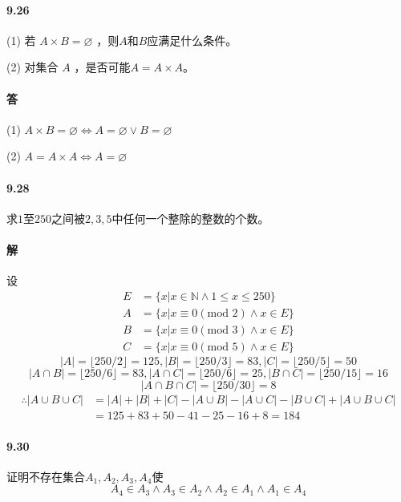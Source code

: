 \documentclass[UTF8]{ctexart}
\newcommand{\snatural}{\mathbb{N}}
\newcommand{\modt}{\text{mod }}
\begin{document}
\paragraph{9.26} \label{9.26}
(1) 若 $A \times B = \varnothing$ ，则$A$和$B$应满足什么条件。

(2) 对集合 $A$ ，是否可能$A = A \times A$。

\paragraph{答}
(1) $A \times B = \varnothing \Longleftrightarrow A=\varnothing \lor B = \varnothing$

(2) $A = A \times A \Longleftrightarrow A = \varnothing$

\paragraph{9.28} \label{9.28}
求$1$至$250$之间被$2,3,5$中任何一个整除的整数的个数。

\paragraph{解}
设
\begin{align*}
    E & = \{x|x \in \snatural \land 1\le x \le 250\} \\
    A & = \{x|x \equiv 0 (\modt 2) \land x \in E\} \\
    B & = \{x|x \equiv 0 (\modt 3) \land x \in E\} \\
    C & = \{x|x \equiv 0 (\modt 5) \land x \in E\} 
\end{align*}
$$|A|=\lfloor 250/2 \rfloor = 125, |B|=\lfloor 250/3 \rfloor = 83, |C|=\lfloor 250/5 \rfloor = 50 $$
$$|A \cap B|=\lfloor 250/6 \rfloor = 83, |A\cap C|=\lfloor 250/6 \rfloor = 25, |B\cap C|=\lfloor 250/15 \rfloor = 16 $$
$$|A \cap B \cap C|=\lfloor 250/30 \rfloor = 8 $$
\begin{align*}
    \therefore |A \cup B \cup C| & = |A| + |B| + |C| - |A \cup B| - |A \cup C| - |B \cup C| + |A \cup B \cup C| \\ & =  125+83+50-41-25-16+8 = 184
\end{align*}

\paragraph{9.30} \label{9.30}
证明不存在集合$A_1, A_2, A_3, A_4$使
$$A_4 \in A_3 \land A_3 \in A_2 \land A_2 \in A_1 \land A_1 \in A_4$$
\end{document}
